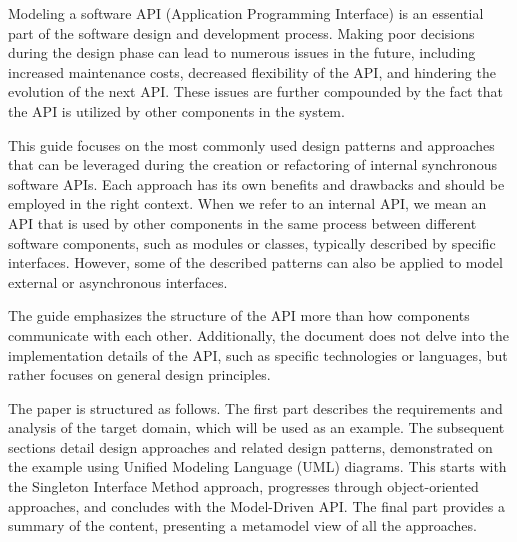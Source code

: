 Modeling a software API (Application Programming Interface) is an essential part of the software design
and development process.
Making poor decisions during the design phase can lead to numerous issues in the future, including increased
maintenance costs, decreased flexibility of the API, and hindering the evolution of the next API\@.
These issues are further compounded by the fact that the API is utilized by other components in the system.

This guide focuses on the most commonly used design patterns and approaches that can be leveraged during
the creation or refactoring of internal synchronous software APIs. Each approach has its own benefits
and drawbacks and should be employed in the right context.
When we refer to an internal API, we mean an API that is used by other components in the same process between
different software components, such as modules or classes, typically described by specific interfaces.
However, some of the described patterns can also be applied to model external or asynchronous interfaces.

The guide emphasizes the structure of the API more than how components communicate with each other.
Additionally, the document does not delve into the implementation details of the API,
such as specific technologies or languages, but rather focuses on general design principles.

The paper is structured as follows.
The first part describes the requirements and analysis of the target domain, which will be used as an example.
The subsequent sections detail design approaches and related design patterns,
demonstrated on the example using Unified Modeling Language (UML) diagrams.
This starts with the Singleton Interface Method approach, progresses through object-oriented approaches,
and concludes with the Model-Driven API\@.
The final part provides a summary of the content, presenting a metamodel view of all the approaches.
